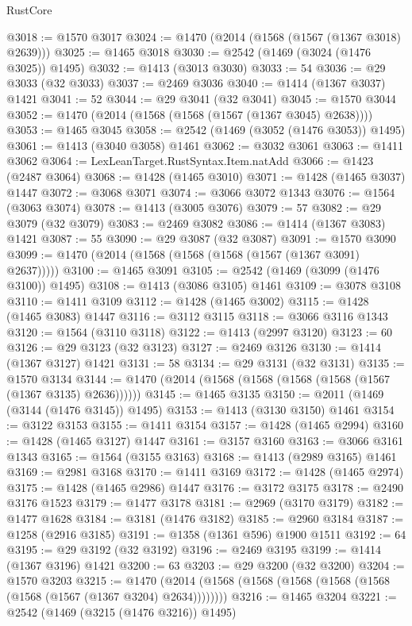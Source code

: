 \begin{lexlean}{RustCore}
\begin{coremodule}
{\begin{coremodule}
{{{{{{{{{{{{{{{{{{{{{{{{{{{{{{{{{{{{{{{{{{{{{{{@3018 := @1570 @3017
@3024 := @1470 (@2014 (@1568 (@1567 (@1367 @3018) @2639)))
@3025 := @1465 @3018
@3030 := @2542 (@1469 (@3024 (@1476 @3025)) @1495)
@3032 := @1413 (@3013 @3030)
@3033 := 54
@3036 := @29 @3033 (@32 @3033)
@3037 := @2469 @3036
@3040 := @1414 (@1367 @3037) @1421
@3041 := 52
@3044 := @29 @3041 (@32 @3041)
@3045 := @1570 @3044
@3052 := @1470 (@2014 (@1568 (@1568 (@1567 (@1367 @3045) @2638))))
@3053 := @1465 @3045
@3058 := @2542 (@1469 (@3052 (@1476 @3053)) @1495)
@3061 := @1413 (@3040 @3058) @1461
@3062 := @3032 @3061
@3063 := @1411 @3062
@3064 := LexLeanTarget.RustSyntax.Item.natAdd
@3066 := @1423 (@2487 @3064)
@3068 := @1428 (@1465 @3010)
@3071 := @1428 (@1465 @3037) @1447
@3072 := @3068 @3071
@3074 := @3066 @3072 @1343
@3076 := @1564 (@3063 @3074)
@3078 := @1413 (@3005 @3076)
@3079 := 57
@3082 := @29 @3079 (@32 @3079)
@3083 := @2469 @3082
@3086 := @1414 (@1367 @3083) @1421
@3087 := 55
@3090 := @29 @3087 (@32 @3087)
@3091 := @1570 @3090
@3099 := @1470 (@2014 (@1568 (@1568 (@1568 (@1567 (@1367 @3091) @2637)))))
@3100 := @1465 @3091
@3105 := @2542 (@1469 (@3099 (@1476 @3100)) @1495)
@3108 := @1413 (@3086 @3105) @1461
@3109 := @3078 @3108
@3110 := @1411 @3109
@3112 := @1428 (@1465 @3002)
@3115 := @1428 (@1465 @3083) @1447
@3116 := @3112 @3115
@3118 := @3066 @3116 @1343
@3120 := @1564 (@3110 @3118)
@3122 := @1413 (@2997 @3120)
@3123 := 60
@3126 := @29 @3123 (@32 @3123)
@3127 := @2469 @3126
@3130 := @1414 (@1367 @3127) @1421
@3131 := 58
@3134 := @29 @3131 (@32 @3131)
@3135 := @1570 @3134
@3144 := @1470 (@2014 (@1568 (@1568 (@1568 (@1568 (@1567 (@1367 @3135) @2636))))))
@3145 := @1465 @3135
@3150 := @2011 (@1469 (@3144 (@1476 @3145)) @1495)
@3153 := @1413 (@3130 @3150) @1461
@3154 := @3122 @3153
@3155 := @1411 @3154
@3157 := @1428 (@1465 @2994)
@3160 := @1428 (@1465 @3127) @1447
@3161 := @3157 @3160
@3163 := @3066 @3161 @1343
@3165 := @1564 (@3155 @3163)
@3168 := @1413 (@2989 @3165) @1461
@3169 := @2981 @3168
@3170 := @1411 @3169
@3172 := @1428 (@1465 @2974)
@3175 := @1428 (@1465 @2986) @1447
@3176 := @3172 @3175
@3178 := @2490 @3176 @1523
@3179 := @1477 @3178
@3181 := @2969 (@3170 @3179)
@3182 := @1477 @1628
@3184 := @3181 (@1476 @3182)
@3185 := @2960 @3184
@3187 := @1258 (@2916 @3185)
@3191 := @1358 (@1361 @596) @1900 @1511
@3192 := 64
@3195 := @29 @3192 (@32 @3192)
@3196 := @2469 @3195
@3199 := @1414 (@1367 @3196) @1421
@3200 := 63
@3203 := @29 @3200 (@32 @3200)
@3204 := @1570 @3203
@3215 := @1470 (@2014 (@1568 (@1568 (@1568 (@1568 (@1568 (@1568 (@1567 (@1367 @3204) @2634))))))))
@3216 := @1465 @3204
@3221 := @2542 (@1469 (@3215 (@1476 @3216)) @1495)
}}}}}}}}}}}}}}}}}}}}}}}}}}}}}}}}}}}}}}}}}}}}}}}
\end{coremodule}}
\end{coremodule}
\end{lexlean}
